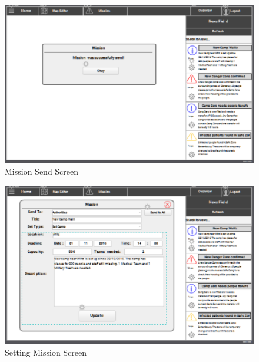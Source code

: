 \begin{figure}[htbp]
\begin{center}
 \caption{\label{fig:W12} Mission Send Screen}
   \includegraphics[width=150mm]{./images/Web/cmissionsendscreen.eps}
\end{center}
\end{figure}
\begin{figure}[htbp]
\begin{center}
 \caption{\label{fig:W13} Setting Mission Screen}
   \includegraphics[width=150mm]{./images/Web/csettingmissionscreen.eps}
\end{center}
\end{figure}
